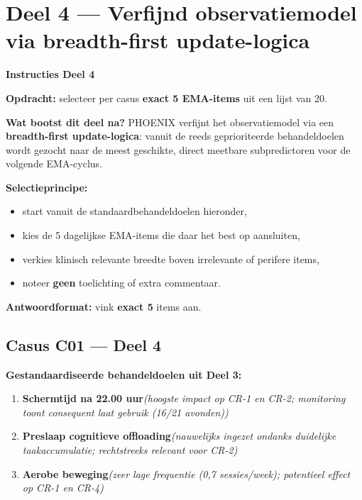 \documentclass[11pt,a4paper]{article}
\begin{document}
\vspace{0.6em}
\newpage


\section{Deel 4 --- Verfijnd observatiemodel via breadth-first update-logica}

\begin{tcolorbox}[colback=purple!4,colframe=RichPurple,arc=2.5mm,boxrule=0.9pt,
  left=10pt,right=10pt,top=9pt,bottom=9pt]
\textbf{\color{RichPurple}Instructies Deel 4}

\smallskip\small
\textbf{Opdracht:} selecteer per casus \textbf{exact 5 EMA-items} uit een lijst van 20.

\textbf{Wat bootst dit deel na?}
PHOENIX verfijnt het observatiemodel via een \textbf{breadth-first update-logica}: vanuit de
reeds geprioriteerde behandeldoelen wordt gezocht naar de meest geschikte, direct meetbare
subpredictoren voor de volgende EMA-cyclus.

\textbf{Selectieprincipe:}
\begin{itemize}[topsep=2pt,itemsep=1pt]
\item start vanuit de standaardbehandeldoelen hieronder,
\item kies de 5 dagelijkse EMA-items die daar het best op aansluiten,
\item verkies klinisch relevante breedte boven irrelevante of perifere items,
\item noteer \textbf{geen} toelichting of extra commentaar.
\end{itemize}

\textbf{Antwoordformat:} vink \textbf{exact 5} items aan.
\end{tcolorbox}

\vspace{0.5em}
\subsection*{Casus C01 --- Deel 4}

\begin{contextbox}
\small\textbf{Gestandaardiseerde behandeldoelen uit Deel 3:}
\begin{enumerate}[topsep=2pt,itemsep=1pt,label=\arabic*.]
\item \textbf{Schermtijd na 22.00 uur}\quad\textit{\small (hoogste impact op CR-1 en CR-2; monitoring toont consequent laat gebruik (16/21 avonden))}
\item \textbf{Preslaap cognitieve offloading}\quad\textit{\small (nauwelijks ingezet ondanks duidelijke taakaccumulatie; rechtstreeks relevant voor CR-2)}
\item \textbf{Aerobe beweging}\quad\textit{\small (zeer lage frequentie (0,7 sessies/week); potentieel effect op CR-1 en CR-4)}
\end{enumerate}
\end{contextbox}
\end{document}

